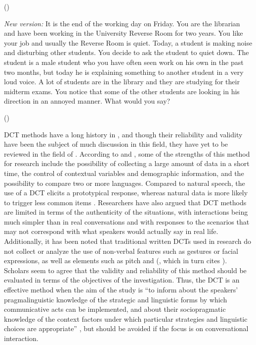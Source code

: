 \documentclass[output=paper]{LSP/langsci}
\begin{document}
(\citealt{Billmyer2000})

\textit{New version:} It is the end of the working day on Friday. You are the librarian and have been working in the University Reverse Room for two years. You like your job and usually the Reverse Room is quiet. Today, a student is making noise and disturbing other students. You decide to ask the student to quiet down. The student is a male student who you have often seen work on his own in the past two months, but today he is explaining something to another student in a very loud voice. A lot of students are in the library and they are studying for their midterm exams. You notice that some of the other students are looking in his direction in an annoyed manner. What would you say?

(\citealt{Billmyer2000})
    \z

DCT methods have a long history in , and though their reliability and validity have been the subject of much discussion in this field, they have yet to be reviewed in the field of . According to \citet{Nurani2009} and \citet{Cyluk2013}, some of the strengths of this method for  research include the possibility of collecting a large amount of data in a short time, the control of contextual variables and demographic information, and the possibility to compare two or more languages. Compared to natural speech, the use of a DCT elicits a prototypical response, whereas natural data is more likely to trigger less common items \citep{Kwon2004}. Researchers have also argued that DCT methods are limited in terms of the authenticity of the situations, with interactions being much simpler than in real conversations and with responses to the scenarios that may not correspond with what speakers would actually say in real life. Additionally, it has been noted that traditional written DCTs used in  research do not collect or analyze the use of non-verbal features such as gestures or facial expressions, as well as  elements such as pitch and  (\citealt{Cyluk2013}, which in turn cites \citealt[326]{Kasper2000}). Scholars seem to agree that the validity and reliability of this method should be evaluated in terms of the objectives of the investigation. Thus, the DCT is an effective method when the aim of the study is “to inform about the speakers’ pragmalinguistic knowledge of the strategic and linguistic forms by which communicative acts can be implemented, and about their sociopragmatic knowledge of the context factors under which particular strategies and linguistic choices are appropriate” \citep[329]{Kasper2000}, but should be avoided if the focus is on conversational interaction.
\end{document}
